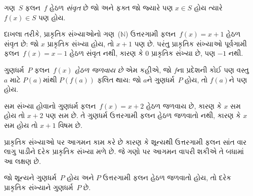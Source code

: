 \begin{defn}
ગણ~$S$ ફલન~$f$ હેઠળ \emph{સંવૃત} છે જો અને ફક્ત જો
જ્યારે પણ $x \in S$ હોય ત્યારે $f(x) \in S$ પણ હોય.
\end{defn}

\begin{explain}
દાખલા તરીકે, પ્રાકૃતિક સંખ્યાઓનો ગણ~($\mathbb{N}$)
ઉત્તરગામી ફલન~$f(x) = x+1$ હેઠળ સંવૃત છે:
જો $x$ પ્રાકૃતિક સંખ્યા હોય, તો $x+1$ પણ છે.
પરંતુ પ્રાકૃતિક સંખ્યાઓ પૂર્વગામી ફલન~$f(x) = x-1$
હેઠળ સંવૃત નથી, કારણ કે $0$ પ્રાકૃતિક સંખ્યા છે, પણ $-1$ નથી.
\end{explain}

\begin{defn}
ગુણધર્મ~$P$ ફલન~$f(x)$ \emph{હેઠળ જળવાય છે} એમ કહીએ,
જો $f$ના પ્રદેશની કોઈ પણ વસ્તુ~$a$ માટે
$P(a)$માંથી $P(f(a))$ ફલિત થાય:
જો $a$ને ગુણધર્મ~$P$ હોય, તો $f(a)$ને પણ હોય.
\end{defn}

\begin{explain}
સમ સંખ્યા હોવાનો ગુણધર્મ ફલન~$f(x) = x+2$ હેઠળ જળવાય છે,
કારણ કે $x$ સમ હોય તો $x+2$ પણ સમ છે.
તે ગુણધર્મ ઉત્તરગામી ફલન હેઠળ જળવાતો નથી,
કારણ કે $x$ સમ હોય તો $x+1$ વિષમ છે.

પ્રાકૃતિક સંખ્યાઓ પર આગમન કામ કરે છે કારણ કે શૂન્યથી
ઉત્તરગામી ફલન સાંત વાર લાગુ પાડીને દરેક પ્રાકૃતિક સંખ્યા મળે છે.
જે ગણો પર આગમન વાપરી શકીએ તે બધામાં આ લક્ષણ છે.
\end{explain}

\begin{defn}
જો શૂન્યને ગુણધર્મ~$P$ હોય અને $P$ ઉત્તરગામી ફલન હેઠળ
જળવાતો હોય, તો દરેક પ્રાકૃતિક સંખ્યાને ગુણધર્મ~$P$ છે.
\end{defn}

